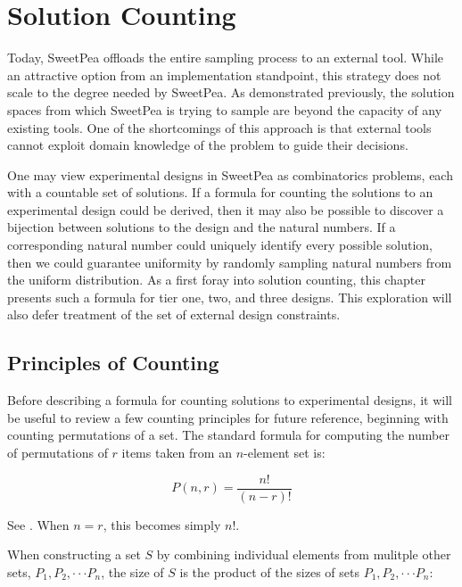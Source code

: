 
\chapter{Solution Counting}

Today, SweetPea offloads the entire sampling process to an external tool. While an attractive option from an implementation standpoint, this strategy does not scale to the degree needed by SweetPea. As demonstrated previously, the solution spaces from which SweetPea is trying to sample are beyond the capacity of any existing tools. One of the shortcomings of this approach is that external tools cannot exploit domain knowledge of the problem to guide their decisions.

One may view experimental designs in SweetPea as combinatorics problems, each with a countable set of solutions. If a formula for counting the solutions to an experimental design could be derived, then it may also be possible to discover a bijection between solutions to the design and the natural numbers. If a corresponding natural number could uniquely identify every possible solution, then we could guarantee uniformity by randomly sampling natural numbers from the uniform distribution. As a first foray into solution counting, this chapter presents such a formula for tier one, two, and three designs. This exploration will also defer treatment of the set of external design constraints.


\section{Principles of Counting}

Before describing a formula for counting solutions to experimental designs, it will be useful to review a few counting principles for future reference, beginning with counting permutations of a set. The standard formula for computing the number of permutations of $r$ items taken from an $n$-element set is:

\[
P(n,r) = \frac{n!}{(n-r)!}
\]

See \cite{brualdi_introductory_2010}. When $n =  r$, this becomes simply $n!$.



When constructing a set $S$ by combining individual elements from mulitple other sets, $P_1, P_2, \cdot\cdot\cdot P_n$, the size of $S$ is the product of the sizes of sets $P_1, P_2, \cdot\cdot\cdot P_n$:

